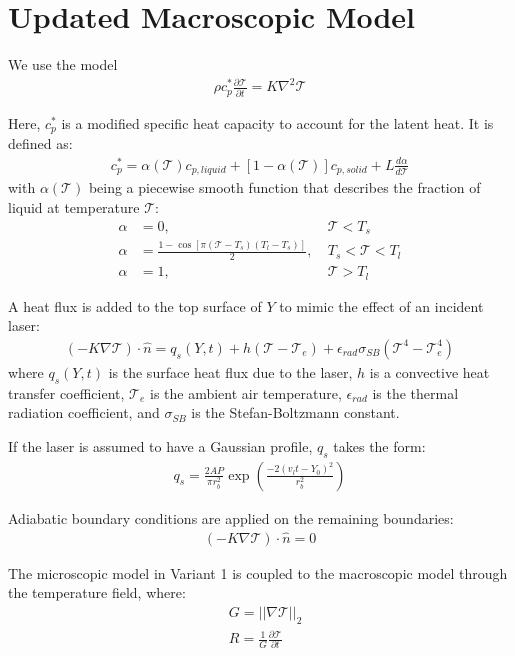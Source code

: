 \documentclass[a4paper,12pt]{article}
\begin{document}
\section{Updated Macroscopic Model}
We use the model 
\begin{align}
    \rho c_p^* \frac{\partial \mathcal{T}}{\partial t} = K \nabla^2 \mathcal{T} \label{one_way_heat_eqn}
\end{align}

Here, $c_p^*$ is a modified specific heat capacity to account for the latent heat. It is defined as:
\begin{align}
c_p^* =  \alpha(\mathcal{T}) c_{p, liquid} + [1-\alpha(\mathcal{T})] c_{p, solid} + L \frac{d\alpha}{d\mathcal{T}}
\end{align}
with $\alpha(\mathcal{T})$ being a piecewise smooth function that describes the fraction of liquid at temperature $\mathcal{T}$:
\begin{align}
\alpha &= 0,~&\mathcal{T}<T_s \\
\alpha &=   \frac{1- \cos[\pi (\mathcal{T}-T_s) (T_l-T_s)]}{2},~&T_s < \mathcal{T} < T_l \\
\alpha &= 1,~&\mathcal{T}>T_l
\end{align}

A heat flux is added to the top surface of $Y$ to mimic the effect of an incident laser:
\begin{align}
    (-K\nabla \mathcal{T}) \cdot \hat{n} = q_s(Y,t) + h(\mathcal{T}-\mathcal{T}_e)+\epsilon_{rad} \sigma_{SB} (\mathcal{T}^4-\mathcal{T}_e^4)
\end{align}
where $q_s(Y,t)$ is the surface heat flux due to the laser, $h$ is a convective heat transfer coefficient, $\mathcal{T}_e$ is the ambient air temperature, $\epsilon_{rad}$ is the thermal radiation coefficient, and $\sigma_{SB}$ is the Stefan-Boltzmann constant.

If the laser is assumed to have a Gaussian profile, $q_s$ takes the form:
\begin{align}
    q_s = \frac{2AP}{\pi r_b^2} \exp \left(\frac{-2(v_l t - Y_0)^2}{r_b^2} \right)
\end{align}

Adiabatic boundary conditions are applied on the remaining boundaries:
\begin{align}
    (-K\nabla \mathcal{T}) \cdot \hat{n} = 0
\end{align}

The microscopic model in Variant 1 is coupled to the macroscopic model through the temperature field, where:
\begin{align}
    &G = ||\nabla \mathcal{T}||_2 \\
    &R = \frac{1}{G}\frac{\partial \mathcal{T}}{\partial t}
\end{align}
\end{document}

